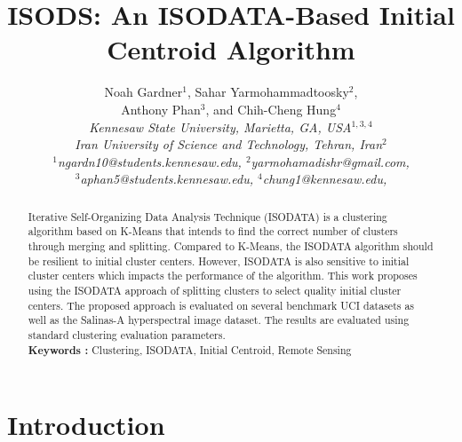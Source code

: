 \documentclass[a4paper,10pt]{article}
\begin{document}
\title{\bf ISODS: An ISODATA-Based Initial Centroid Algorithm}
\author{Noah Gardner$^1$,
      Sahar Yarmohammadtoosky$^2$, \\
      Anthony Phan$^3$,
      and Chih-Cheng Hung$^4$\\[1ex]
      \sl \small Kennesaw State University,
      Marietta, GA, USA$^{1, 3, 4}$\\
      \sl \small Iran University of Science and Technology,
      Tehran, Iran$^2$\\[1ex]
      \small $^1$ngardn10@students.kennesaw.edu, 
      \small $^2$yarmohamadishr@gmail.com, \\
      \small $^3$aphan5@students.kennesaw.edu,
      \small $^4$chung1@kennesaw.edu, \\}
\date{}
\maketitle

\begin{abstract}
      \noindent 
      Iterative Self-Organizing Data Analysis Technique (ISODATA) is a clustering
      algorithm based on K-Means that intends to find the correct number of
      clusters through merging and splitting. Compared to K-Means, the ISODATA
      algorithm should be resilient to initial cluster centers. However, ISODATA
      is also sensitive to initial cluster centers which impacts the performance
      of the algorithm. This work proposes using the ISODATA approach of splitting
      clusters to select quality initial cluster centers. The proposed approach is
      evaluated on several benchmark UCI datasets as well as the Salinas-A
      hyperspectral image dataset. The results are evaluated using standard
      clustering evaluation parameters. \\
      {\bf Keywords :} Clustering, ISODATA, Initial Centroid, Remote Sensing
\end{abstract}




\section{Introduction}
\end{document}
